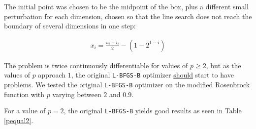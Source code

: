 The initial point was chosen to be the midpoint of the box, plus a different small perturbation for each dimension, chosen so that the line search does not reach the boundary of several dimensions in one step:

\begin{equation}
  \begin{aligned}
    x_i = \frac{u_i + l_i}{2} - \left(1 - 2^{1 - i}\right)
  \end{aligned}
\end{equation}

The problem is twice continuously differentiable for values of $p \geq 2$, but as the values of $p$ approach $1$, the original \texttt{L-BFGS-B} optimizer \underline{should} start to have problems. We tested the original \texttt{L-BFGS-B} optimizer on the modified Rosenbrock function with $p$ varying between $2$ and $0.9$. 

For a value of $p = 2$, the original \texttt{L-BFGS-B} yields good results as seen in Table \ref{pequal2}.

